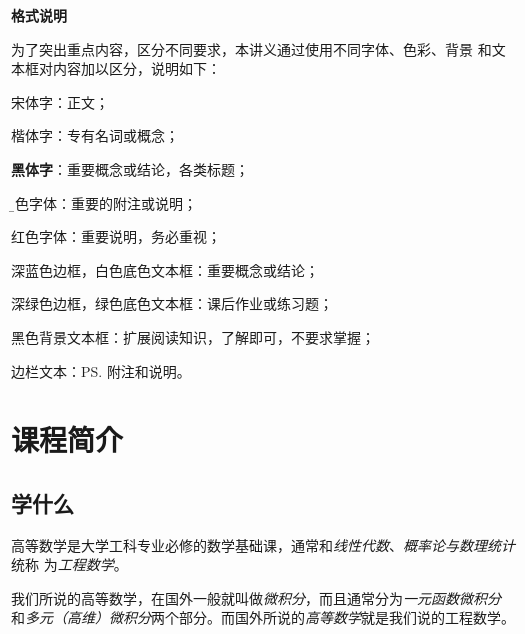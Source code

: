 \begin{center}
	{\bf\Large 格式说明}
\end{center}

\bigskip\bigskip

为了突出重点内容，区分不同要求，本讲义通过使用不同字体、色彩、背景
和文本框对内容加以区分，说明如下：

\bigskip\bigskip

宋体字：正文；

\bigskip\bigskip

{\kaishu 楷体字：}专有名词或概念；

\bigskip\bigskip

{\bf 黑体字}：重要概念或结论，各类标题；

\bigskip\bigskip

{\b 蓝色字体}：重要的附注或说明；

\bigskip\bigskip

{\color{red} 红色字体：}重要说明，务必重视；

\bigskip\bigskip

\begin{thx}
	深蓝色边框，白色底色文本框：重要概念或结论；
\end{thx}

\bigskip\bigskip

\begin{ext}
	深绿色边框，绿色底色文本框：课后作业或练习题；
\end{ext}

\bigskip\bigskip

\begin{shaded}
	黑色背景文本框：扩展阅读知识，了解即可，不要求掌握；
\end{shaded}

\bigskip\bigskip

边栏文本：\ps{附注和说明。}

\newpage

\section{课程简介}

\subsection{学什么}

高等数学是大学工科专业必修的数学基础课，通常和{\it 线性代数}、{\it 概率论与数理统计}统称
为{\it 工程数学}。

我们所说的高等数学，在国外一般就叫做{\it 微积分}，而且通常分为{\it 一元函数微积分}
和{\it 多元（高维）微积分}两个部分。而国外所说的{\it 高等数学}就是我们说的工程数学。

